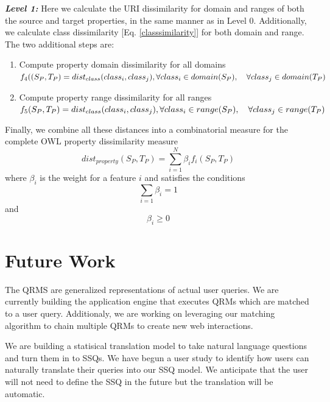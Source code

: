 \documentclass{IOS-Book-Article}
\begin{document}
\indent\textit{\textbf{Level 1:}} Here we calculate the URI dissimilarity for domain and ranges of both the  source and target properties, in the same manner as in Level 0. Additionally, we calculate class dissimilarity [Eq. \eqref{classsimilarity}] for both domain and range. The two additional steps are:
\begin{enumerate}
    \item Compute property domain dissimilarity for all domains 
    \\ $f_4((S_P, T_P)= dist_{class}(class_i, class_j ),
    \\ \forall class_i \in domain(S_P),\quad \forall class_j \in domain(T_P)$

    \item Compute property range dissimilarity for all ranges  
    \\ $f_5(S_P, T_P)= dist_{class}(class_i, class_j),
    \\\forall class_i \in range(S_P),\quad \forall class_j \in range(T_P)$
\end{enumerate}
\indent Finally, we combine all these distances into a combinatorial measure for the complete OWL property dissimilarity measure
\begin{equation}
\label{propertysimilarity}
dist_{property}(S_P, T_P) = \sum_{i=1}^N {{\beta}_i f_i(S_P, T_P)} 
\end{equation}
where ${\beta}_i$ is the weight for a feature $i$ and satisfies the conditions 
\begin{equation}
\label{betaconstraint1}
\sum_{i=1} {{\beta}_i} = 1
\end{equation}
and 
\begin{equation}
\label{betaconstraint2}
{\beta}_i \geq 0
\end{equation} 



\section*{Future Work}
The QRMS are generalized representations of actual user queries. We are currently building the application engine that executes QRMs which are matched to a user query. Additionaly, we are working on leveraging our matching algorithm to chain multiple QRMs to create new web interactions.

We are building a statisical translation model to take natural language questions and turn them in to SSQs. We have begun a user study to identify how users can naturally translate their queries into our SSQ model. We anticipate that the user will not need to define the SSQ in the future but the translation will be automatic.
\end{document}
